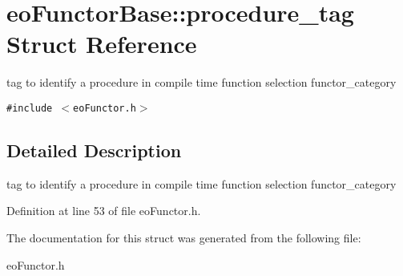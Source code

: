 \section{eo\-Functor\-Base::procedure\_\-tag Struct Reference}
\label{structeo_functor_base_1_1procedure__tag}
tag to identify a procedure in compile time function selection functor\_\-category  


{\tt \#include $<$eo\-Functor.h$>$}



\subsection{Detailed Description}
tag to identify a procedure in compile time function selection functor\_\-category 



Definition at line 53 of file eo\-Functor.h.

The documentation for this struct was generated from the following file:\begin{CompactItemize}
\item 
eo\-Functor.h\end{CompactItemize}
